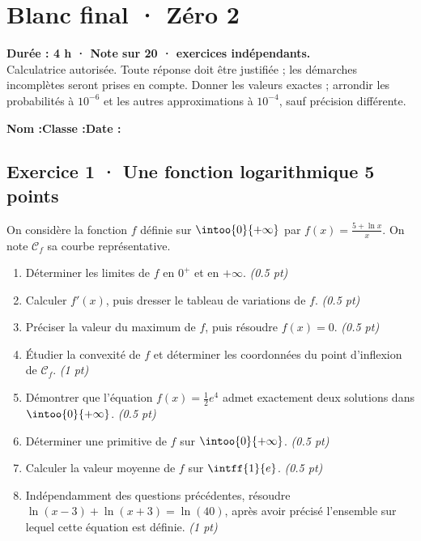 \fi

\mxnewpage{}\label{sujet:9-2}

\section*{Blanc final · Zéro 2}


\textbf{Durée : 4 h · Note sur 20 ·  exercices indépendants.}\\Calculatrice autorisée. Toute réponse doit être justifiée ; les démarches incomplètes seront prises en compte. Donner les valeurs exactes ; arrondir les probabilités à $10^{-6}$ et les autres approximations à $10^{-4}$, sauf précision différente.

\smallskip\textbf{Nom :}\enspace\dotfill\quad\textbf{Classe :}\enspace\dotfill\quad\textbf{Date :}\enspace\dotfill

\subsection*{Exercice 1 · Une fonction logarithmique \hfill 5 points}On considère la fonction $f$ définie sur $\intoo{0}{+\infty}$ par $f(x)=\frac{5+\ln x}x$. On note $\mathcal C_f$ sa courbe représentative.

\begin{enumerate}

\item Déterminer les limites de $f$ en $0^+$ et en $+\infty$. \hfill\textit{(\num{0,5} pt)}

\item Calculer $f' (x)$, puis dresser le tableau de variations de $f$. \hfill\textit{(\num{0,5} pt)}

\item Préciser la valeur du maximum de $f$, puis résoudre $f(x)=0$. \hfill\textit{(\num{0,5} pt)}

\item Étudier la convexité de $f$ et déterminer les coordonnées du point d'inflexion de $\mathcal C_f$. \hfill\textit{(1 pt)}

\item Démontrer que l'équation $f(x)=\frac12 e^{4}$ admet exactement deux solutions dans $\intoo{0}{+\infty}$. \hfill\textit{(\num{0,5} pt)}

\item Déterminer une primitive de $f$ sur $\intoo{0}{+\infty}$. \hfill\textit{(\num{0,5} pt)}

\item Calculer la valeur moyenne de $f$ sur $\intff{1}{e}$. \hfill\textit{(\num{0,5} pt)}

\item Indépendamment des questions précédentes, résoudre $\ln(x-3)+\ln(x+3)=\ln(40)$, après avoir précisé l'ensemble sur lequel cette équation est définie. \hfill\textit{(1 pt)}

\end{enumerate}

